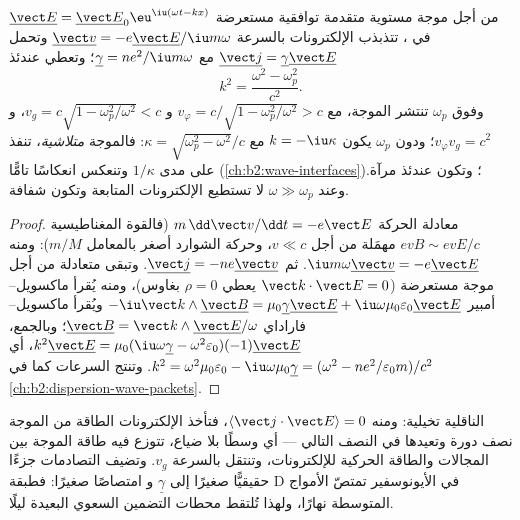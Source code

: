 \begin{theorem}\label{thm:b2:waves-in-media:plasmadispersion}
من أجل موجة مستوية متقدمة توافقية مستعرضة $\underline{\vect E} = \underline{\vect E}_0\eu^{\iu(\omega t - kx)}$ في
، تتذبذب الإلكترونات بالسرعة $\underline{\vect v} = -e\underline{\vect E}/\iu m\omega$
وتحمل  $\underline{\vect j} = \underline\gamma\underline{\vect E}$ مع
$\underline\gamma = ne^2/\iu m\omega$؛ وتعطي  عندئذ
\[
k^2 = \frac{\omega^2 - \omega_p^2}{c^2} .
\]
وفوق $\omega_p$ تنتشر الموجة، مع $v_\varphi = c/\sqrt{1 - \omega_p^2/\omega^2}
> c$ و $v_g = c\sqrt{1 - \omega_p^2/\omega^2} < c$، و $v_\varphi v_g = c^2$؛ ودون
$\omega_p$ يكون $k = -\iu\kappa$ مع $\kappa = \sqrt{\omega_p^2 - \omega^2}/c$: فالموجة
\emph{متلاشية}، تنفذ على مدى $1/\kappa$ وتنعكس انعكاسًا تامًّا
(\cref{ch:b2:wave-interfaces})؛ وتكون  عندئذ مرآة. وعند $\omega
\gg \omega_p$ لا تستطيع الإلكترونات المتابعة وتكون  شفافة.
\end{theorem}

\begin{proof}
معادلة الحركة $m\,\dd\vect v/\dd t = -e\vect E$ (فالقوة المغناطيسية
$ev B \sim evE/c$ مهمَلة من أجل $v \ll c$، وحركة الشوارد
أصغر بالمعامل $m/M$): ومنه $\iu m\omega\underline{\vect v} = -e\underline{\vect E}$. ثم
$\underline{\vect j} = -ne\underline{\vect v}$. وتبقى  متعادلة من أجل موجة
مستعرضة ($\vect k\cdot\vect E = 0$ يعطي $\rho = 0$ بغاوس)، ومنه
يُقرأ ماكسويل--أمبير $-\iu\vect k\wedge\underline{\vect B} = \mu_0\underline\gamma\underline{\vect E}
+ \iu\omega\mu_0\varepsilon_0\underline{\vect E}$ ويُقرأ ماكسويل--فاراداي $\underline{\vect B} = \vect k
\wedge\underline{\vect E}/\omega$؛ وبالجمع، $k^2\underline{\vect E} = \mu_0(\iu\omega\underline\gamma -
\omega^2\varepsilon_0)(-1)\underline{\vect E}$، أي $k^2 = \omega^2\mu_0\varepsilon_0 - \iu\omega\mu_0
\underline\gamma = (\omega^2 - ne^2/\varepsilon_0m)/c^2$. وتنتج السرعات كما في
\cref{ch:b2:dispersion-wave-packets}.
\end{proof}

\begin{remark}\label{rem:b2:waves-in-media:plasmaenergy}
الناقلية تخيلية: ومنه $\langle\vect j\cdot\vect E\rangle = 0$، فتأخذ
الإلكترونات الطاقة من الموجة نصف دورة وتعيدها
في النصف التالي --- أي وسطًا بلا ضياع، تتوزع فيه طاقة الموجة
بين المجالات والطاقة الحركية للإلكترونات، وتنتقل
بالسرعة $v_g$. وتضيف التصادمات جزءًا حقيقيًّا صغيرًا إلى $\underline\gamma$ و
امتصاصًا صغيرًا: فطبقة D في الأيونوسفير تمتصّ الأمواج المتوسطة
نهارًا، ولهذا تُلتقط محطات التضمين السعوي البعيدة ليلًا.
\end{remark}

